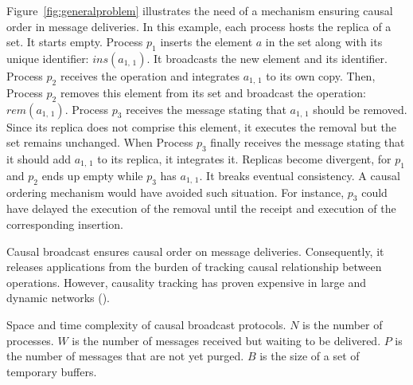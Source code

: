 

Figure~\ref{fig:generalproblem} illustrates the need of a mechanism ensuring
causal order in message deliveries. %
In this example, each process hosts the replica of a set. It starts
empty. Process $p_1$ inserts the element $a$ in the set along with its unique
identifier: $ins(a_{1,\,1})$. It broadcasts the new element and its
identifier. Process $p_2$ receives the operation and integrates $a_{1,\,1}$ to
its own copy. Then, Process $p_2$ removes this element from its set and
broadcast the operation: $rem(a_{1,\,1})$. Process $p_3$ receives the message
stating that $a_{1,\,1}$ should be removed. Since its replica does not comprise
this element, it executes the removal but the set remains unchanged. When
Process $p_3$ finally receives the message stating that it should add
$a_{1,\,1}$ to its replica, it integrates it. Replicas become divergent, for
$p_1$ and $p_2$ ends up empty while $p_3$ has $a_{1,\,1}$. It breaks eventual
consistency. A causal ordering mechanism would have avoided such situation. For
instance, $p_3$ could have delayed the execution of the removal until the
receipt and execution of the corresponding insertion.

Causal broadcast ensures causal order on message deliveries. Consequently, it
releases applications from the burden of tracking causal relationship between
operations. However, causality tracking has proven expensive in large and
dynamic networks (\REF).

\begin{table}
  \caption{\label{table:comparison} Space and time complexity of causal broadcast protocols. $N$ is the number of processes. $W$ is the number of messages received but waiting to be delivered.
    $P$ is the number of messages that are not yet purged.
    $B$ is the size of a set of temporary buffers.}
  
\end{table}

